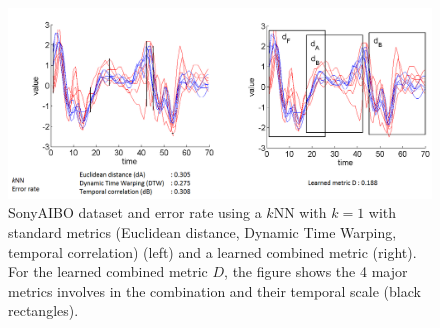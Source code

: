
\begin{figure}[h!]
\centering
\includegraphics[width=1\linewidth]{images/SonyAIBO2}
\caption{SonyAIBO dataset and error rate using a $k$NN with $k=1$ with standard metrics (Euclidean distance, Dynamic Time Warping, temporal correlation) (left) and a learned combined metric (right). For the learned combined metric $D$, the figure shows the 4 major metrics involves in the combination and their temporal scale (black rectangles).}
\label{fig:SonyAIBO}
\end{figure}


